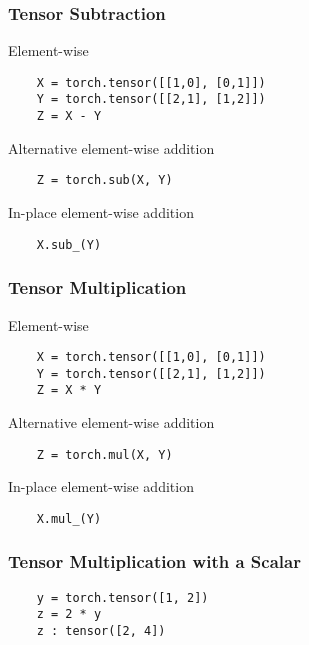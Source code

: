 \documentclass[14 pt]{beamer}
\begin{document}
\begin{frame}[fragile]
  \frametitle{Tensor Subtraction}
  \begin{block}{Element-wise}
\begin{verbatim}
    X = torch.tensor([[1,0], [0,1]]) 
    Y = torch.tensor([[2,1], [1,2]]) 
    Z = X - Y 
\end{verbatim}
  \end{block}
  \begin{block}{Alternative element-wise addition}
\begin{verbatim}
    Z = torch.sub(X, Y)
\end{verbatim}
  \end{block}
  \begin{block}{In-place element-wise addition}
\begin{verbatim}
    X.sub_(Y) 
\end{verbatim}
  \end{block}
\end{frame}

\begin{frame}[fragile]
  \frametitle{Tensor Multiplication}
  \begin{block}{Element-wise}
\begin{verbatim}
    X = torch.tensor([[1,0], [0,1]]) 
    Y = torch.tensor([[2,1], [1,2]]) 
    Z = X * Y 
\end{verbatim}
  \end{block}
  \begin{block}{Alternative element-wise addition}
\begin{verbatim}
    Z = torch.mul(X, Y)
\end{verbatim}
  \end{block}
  \begin{block}{In-place element-wise addition}
\begin{verbatim}
    X.mul_(Y) 
\end{verbatim}
  \end{block}
\end{frame}

\begin{frame}[fragile]
  \frametitle{Tensor Multiplication with a Scalar}
  \begin{block}{}
\begin{verbatim}
    y = torch.tensor([1, 2]) 
    z = 2 * y
    z : tensor([2, 4])
\end{verbatim}
  \end{block}
\end{frame}
\end{document}
